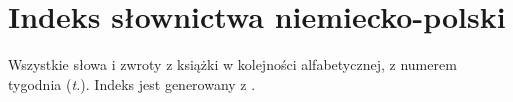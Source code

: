 \chapter{Indeks słownictwa niemiecko-polski}
Wszystkie słowa i zwroty z książki w kolejności alfabetycznej, z numerem tygodnia (\textit{t.}).
Indeks jest generowany z .

